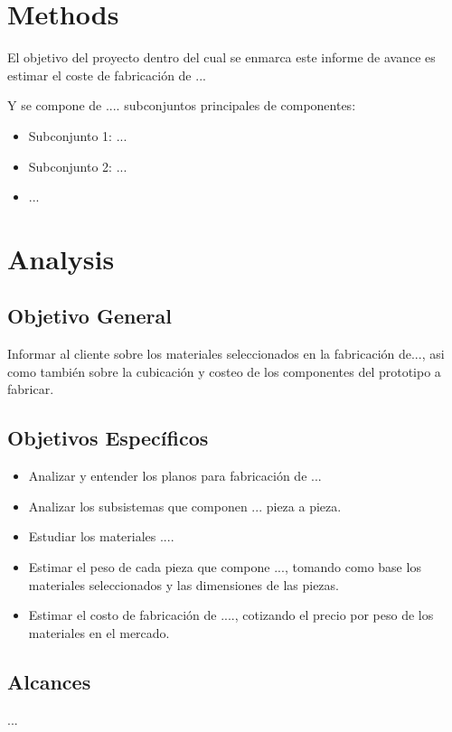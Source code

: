 \documentclass[12pt]{article}
\begin{document}
\section{Methods}

\qquad El objetivo del proyecto dentro del cual se enmarca este informe de avance es estimar el coste de fabricación de ...



\qquad Y se compone de .... subconjuntos principales de componentes:
\begin{itemize}
\item Subconjunto 1: ...
\item Subconjunto 2: ...
\item ...
\end{itemize}





\newpage
\section{Analysis}
\subsection{Objetivo General}

\qquad Informar al cliente sobre los materiales seleccionados en la fabricación de..., asi como también sobre la cubicación y costeo de los componentes del prototipo a fabricar.
\subsection{Objetivos Específicos}
\begin{itemize}
\item Analizar y entender los planos para fabricación de ...
\item Analizar los subsistemas que componen ... pieza a pieza.
\item Estudiar los materiales ....
\item Estimar el peso de cada pieza que compone ..., tomando como base los materiales seleccionados y las dimensiones de las piezas.
\item Estimar el costo de fabricación de ...., cotizando el precio por peso de los materiales en el mercado. 
\end{itemize}
\subsection{Alcances}
\qquad ...
\end{document}

